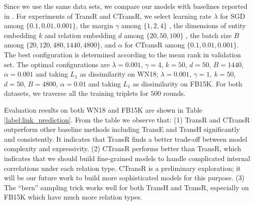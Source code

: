     Since we use the same data sets, we compare our models with baselines reported in . For experiments of TransR and CTransR, we select learning rate $\lambda$ for SGD among $\{0.1, 0.01, 0.001\}$, the margin $\gamma$ among $\{1, 2, 4\}$ , the dimensions of entity embedding $k$ and relation embedding $d$ among $\{20,50,100\}$ , the batch size $B$ among $\{20, 120, 480, 1440, 4800\}$, and $\alpha$ for CTransR among $\{0.1,0.01,0.001\}$. The best configuration is determined according to the mean rank in validation set.  The optimal configurations are $\lambda = 0.001$, $\gamma= 4$, $k = 50$, $d = 50$, $B = 1440$, $\alpha=0.001$ and taking $L_1$ as dissimilarity on WN18; $\lambda = 0.001$, $\gamma = 1$, $k = 50$, $d = 50$, $B = 4800$, $\alpha=0.01$ and taking $L_1$ as dissimilarity on FB15K. For both datasets, we traverse all the training triplets for $500$ rounds.

    Evaluation results on both WN18 and FB15K are shown in Table \ref{label:link_prediction}. From the table we observe that: (1) TransR and CTransR outperform other baseline methods including TransE and TransH significantly and consistently. It indicates that TransR finds a better trade-off between model complexity and expressivity. (2) CTransR performs better than TransR, which indicates that we should build fine-grained models to handle complicated internal correlations under each relation type. CTransR is a preliminary exploration; it will be our future work to build more sophisticated models for this purpose.  (3) The ``bern'' sampling trick works well for both TransH and TransR, especially on FB15K which have much more relation types.



